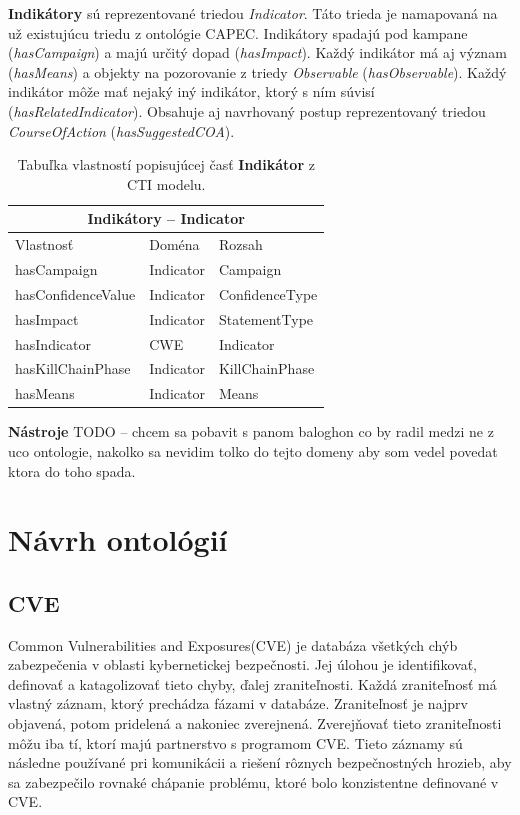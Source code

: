 \documentclass[12pt, a4paper, oneside]{book}
\begin{document}
\textbf{Indikátory} sú reprezentované triedou \textit{Indicator}. Táto trieda je namapovaná na už existujúcu triedu z ontológie CAPEC. Indikátory spadajú pod kampane (\textit{hasCampaign}) a majú určitý dopad (\textit{hasImpact}). Každý indikátor má aj význam (\textit{hasMeans}) a objekty na pozorovanie z triedy \textit{Observable} (\textit{hasObservable}). Každý indikátor môže mať nejaký iný indikátor, ktorý s ním súvisí (\textit{hasRelatedIndicator}). Obsahuje aj navrhovaný postup reprezentovaný triedou \textit{CourseOfAction} (\textit{hasSuggestedCOA}).
\begin{table}[hbt!]
\centering
\begin{tabular}{ |p{5cm}||p{3cm}|p{3cm}|  }
 \hline
 \multicolumn{3}{|c|}{Indikátory -- Indicator} \\
 \hline
 Vlastnosť & Doména & Rozsah\\
 \hline
 hasCampaign & Indicator & Campaign\\
 hasConfidenceValue & Indicator & ConfidenceType\\
 hasImpact & Indicator & StatementType\\
 hasIndicator & CWE & Indicator\\
 hasKillChainPhase & Indicator & KillChainPhase\\
 hasMeans & Indicator & Means\\
 \hline
\end{tabular}
\caption{Tabuľka vlastností popisujúcej časť \textbf{Indikátor} z CTI modelu.}
\label{tab:template}
\end{table}


\textbf{Nástroje}
TODO -- chcem sa pobavit s panom baloghon co by radil medzi ne z uco ontologie, nakolko sa nevidim tolko do tejto domeny aby som vedel povedat ktora do toho spada.


\chapter{Návrh ontológií}
\section{CVE}
Common Vulnerabilities and Exposures(CVE) je databáza všetkých chýb zabezpečenia v oblasti kybernetickej bezpečnosti. Jej úlohou je identifikovať, definovať a katagolizovať tieto chyby, ďalej zraniteľnosti. Každá zraniteľnosť má vlastný záznam, ktorý prechádza fázami v databáze. Zraniteľnosť je najprv objavená, potom pridelená a nakoniec zverejnená. Zverejňovať tieto zraniteľnosti môžu iba tí, ktorí majú partnerstvo s programom CVE. Tieto záznamy sú následne používané pri komunikácii a riešení rôznych bezpečnostných hrozieb, aby sa zabezpečilo rovnaké chápanie problému, ktoré bolo konzistentne definované v CVE.  
\end{document}
